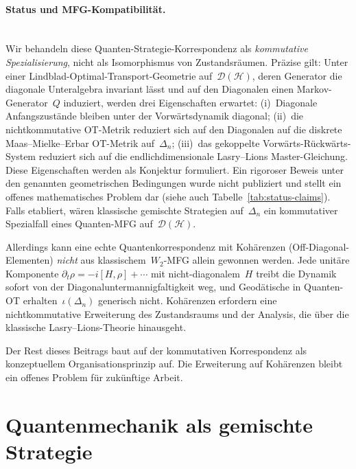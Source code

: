 \documentclass[12pt,a4paper]{article}
\theoremstyle{remark}
\begin{document}
\paragraph{Status und MFG-Kompatibilit\"at.}\mbox{}\\
Wir behandeln diese Quanten-Strategie-\allowbreak Korrespondenz als \emph{kommutative Spezialisierung}, nicht als Isomorphismus von Zustandsr\"aumen. Pr\"azise gilt: Unter einer Lindblad-Optimal-\allowbreak Transport-Geometrie auf~$\mathcal{D}(\mathcal{H})$, deren Generator die diagonale Unteralgebra invariant l\"asst und auf den Diagonalen einen Markov-Generator~$Q$ induziert, werden drei Eigenschaften erwartet: (i)~Diagonale Anfangszust\"ande bleiben unter der Vorw\"artsdynamik diagonal; (ii)~die nichtkommutative OT-Metrik reduziert sich auf den Diagonalen auf die diskrete Maas--Mielke--Erbar OT-Metrik auf~$\Delta_n$; (iii)~das gekoppelte Vorw\"arts-R\"uckw\"arts-System reduziert sich auf die endlichdimensionale Lasry--Lions Master-Gleichung. Diese Eigenschaften werden als Konjektur formuliert. Ein rigoroser Beweis unter den genannten geometrischen Bedingungen wurde nicht publiziert und stellt ein offenes mathematisches Problem dar (siehe auch Tabelle~\ref{tab:status-claims}). Falls etabliert, w\"aren klassische gemischte Strategien auf~$\Delta_n$ ein kommutativer Spezialfall eines Quanten-MFG auf~$\mathcal{D}(\mathcal{H})$.

Allerdings kann eine echte Quantenkorrespondenz mit Koh\"arenzen (Off-Diagonal-Elementen) \emph{nicht} aus klassischem~$W_2$-MFG allein gewonnen werden. Jede unit\"are Komponente $\partial_t \rho = -i[H, \rho] + \cdots$ mit nicht-diagonalem~$H$ treibt die Dynamik sofort von der Diagonaluntermannigfaltigkeit weg, und Geod\"atische in Quanten-OT erhalten~$\iota(\Delta_n)$ generisch nicht. Koh\"arenzen erfordern eine nichtkommutative Erweiterung des Zustandsraums und der Analysis, die \"uber die klassische Lasry--Lions-Theorie hinausgeht.

Der Rest dieses Beitrags baut auf der kommutativen Korrespondenz als konzeptuellem Organisationsprinzip auf. Die Erweiterung auf Koh\"arenzen bleibt ein offenes Problem f\"ur zuk\"unftige Arbeit.

\section{Quantenmechanik als gemischte Strategie}
\label{sec:quantum}
\end{document}

